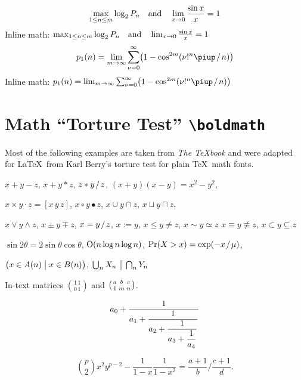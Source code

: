 \documentclass[12pt, a4paper, oneside]{article}
\newcommand*{\divslash}{%
	\mathbin{%
		\nonscript\mskip-2mu / \nonscript\mskip-2mu%
	}%
}  %
\theoremstyle{Plain}
\theoremstyle{Definition}
\theoremstyle{Remark}
\begin{document}
\begin{appendix}
$$\max_{1\le n\le m}\log_2P_n \quad \hbox{and} \quad
\lim_{x\to0}\frac{\sin x}{x}=1$$
Inline math:
$\max_{1\le n\le m}\log_2P_n \quad \hbox{and} \quad
\lim_{x\to0}\frac{\sin x}{x}=1$
$$p_1(n)=\lim_{m\to\infty}\sum_{\nu=0}^\infty\bigl(1-\cos^{2m}(\nu!^n\piup \divslash n)\bigr)$$
Inline math:
$p_1(n)=\lim_{m\to\infty}\sum_{\nu=0}^\infty\bigl(1-\cos^{2m}(\nu!^n\piup \divslash n)\bigr)$

\clearpage

\begingroup
\bfseries\boldmath

\section{Math \texorpdfstring{``}{“}Torture Test\texorpdfstring{''}{”} \texttt{\textbackslash boldmath}}

Most of the following examples are taken from \textit{The \TeX book} \citep[][see \url{https://ctan.org/pkg/texbook}]{knuth:ct:a} and were adapted for \LaTeX\ from Karl Berry's torture test for plain \TeX\ math fonts.

\noindent $x + y - z$, \quad $x + y * z$, \quad $z * y \divslash z$, \quad
$(x+y)(x-y) = x^2 - y^2$,

\noindent $x \times y \cdot z = [x\, y\, z]$, \quad $x\circ y \bullet z$, \quad
$x\cup y \cap z$, \quad $x\sqcup y \sqcap z$, \quad

\noindent $x \vee y \wedge z$, \quad $x\pm y\mp z$, \quad
$x=y \divslash z$, \;\; $x:=y$, \;\; $x\le y \ne z$, \;\; $x \sim y \simeq z$
$x \equiv y \nequiv z$, \;\; $x\subset y \subseteq z$

\noindent $\sin2\theta=2\sin\theta\cos\theta$, \quad
$\hbox{O}(n\log n\log n)$, \quad
$\Pr(X>x)=\exp(-x \divslash \mu)$,

\noindent $\bigl(x\in A(n)\bigm|x\in B(n)\bigr)$, \quad
$\bigcup_n X_n\bigm\|\bigcap_n Y_n$


\noindent In-text matrices $\binom{1\,1}{0\,1}$ and $\bigl(\genfrac{}{}{0pt}{}{a}{1}\genfrac{}{}{0pt}{}{b}{m}\genfrac{}{}{0pt}{}{c}{n}\bigr)$.


$$a_0+\frac1{\displaystyle a_1 +
	{\strut \frac1{\displaystyle a_2 +
			{\strut \frac1{\displaystyle a_3 +
					{\strut \frac1{\displaystyle a_4}}}}}}}$$


$$\binom{p}{2}x^2y^{p-2} - \frac1{1 - x}\frac{1}{1 - x^2}
=
\frac{a+1}{b}\bigg/\frac{c+1}{d}.$$


\end{appendix}
\end{document}
